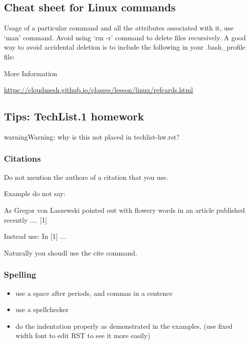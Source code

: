 \subsection{Cheat sheet for Linux commands}
\label{\detokenize{faq:cheat-sheet-for-linux-commands}}
Usage of a particular command and all the attributes associated with
it, use `man' command. Avoid using `rm -r' command to delete files
recursively. A good way to avoid accidental deletion is to include the
following in your .bash\_profile file:

\begin{sphinxVerbatim}[commandchars=\\\{\}]
 
 
 
 
\end{sphinxVerbatim}

More Information

\url{https://cloudmesh.github.io/classes/lesson/linux/refcards.html}


\subsection{Tips: TechList.1 homework}
\label{\detokenize{faq:tips-techlist-1-homework}}
\begin{sphinxadmonition}{warning}{Warning:}
why is this not placed in techlist-hw.rst?
\end{sphinxadmonition}


\subsubsection{Citations}
\label{\detokenize{faq:citations}}
Do not mention the authors of a citation that you use.

Example do not say:

As Gregor von Laszewski pointed out with flowery words in an article published recently .... {[}1{]}

Instead use: In {[}1{]} ...

Naturally you shoudl use the cite command.


\subsubsection{Spelling}
\label{\detokenize{faq:spelling}}\begin{itemize}
\item {} 
use a space after periods, and commas in a centence

\item {} 
use a spellchecker

\item {} 
do the indentation properly as demonstrated in the examples. (use
fixed width font to edit RST to see it more easily)

\end{itemize}



